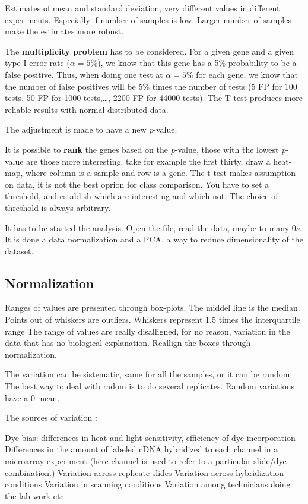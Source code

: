 	Estimates of mean and standard deviation, very different values in different experiments. Especially if number of samples is low. Larger number of samples make the estimates more robust.

	The \textbf{multiplicity problem} has to be considered.
	For a given gene and a given type I error rate ($ \alpha=5\% $), we know that this gene has a
	5\% probability to be a false positive. Thus, when doing one test at $\alpha=5\%$  for each
	gene, we know that the number of false positives will be 5\% times the number of
	tests (5 FP for 100 tests, 50 FP for 1000 tests,…, 2200 FP for 44000 tests).
	The T-test produces more reliable results with normal distributed data.


	The adjustment is made to have a new \textit{p}-value.

	It is possible to \textbf{rank} the genes based on the \textit{p}-value, those with the lowest \textit{p}-value are those more interesting. take for example the first thirty, draw a heat-map, where column is a sample and row is a gene. The t-test makes assumption on data, it is not the best oprion for class comparison. You have to set a threshold, and establish which are interesting and which not. The choice of threshold is always arbitrary. 

	It has to be started the analysis. Open the file, read the data, maybe to many $ 0s $. It is done a data normalization and a PCA, a way to reduce dimensionality of the dataset. 

	\subsection{Normalization}
	Ranges of values are presented through box-plots. The middel line is the median. Points out of whiskers are outliers. Whiskers represent 1.5 times the interquartile range %
	The range of values are really disalligned, for no reason, variation in the data that has no biological explanation. Reallign the boxes through normalization.

	The variation can be sistematic, same for all the samples, or it can be random. The best way to deal with radom is to do several replicates. Random variations have a 0 mean. 

	The sources of variation :

	Dye bias: differences in heat and light sensitivity, efficiency of
	dye incorporation
	Differences in the amount of labeled cDNA hybridized to each
	channel in a microarray experiment (here channel is used to
	refer to a particular slide/dye combination.)
	Variation across replicate slides
	Variation across hybridization conditions
	Variation in scanning conditions
	Variation among technicians doing the lab work
	etc.

